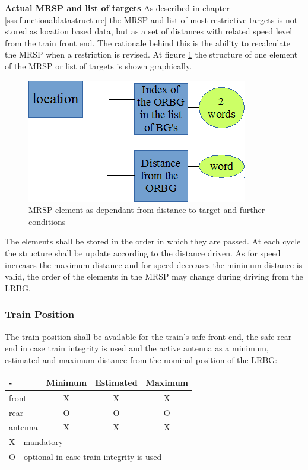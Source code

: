 \textbf{Actual MRSP and list of targets}
As described in chapter \ref{sss:functionaldatastructure} the MRSP and list of most restrictive targets is not stored as location based data, but as a set of distances with related speed level from the train front end. The rationale behind this is the ability to recalculate the MRSP when a restriction is revised.
At figure \ref{fig:SingleElementLocationBasedDataStructure} the structure of one element of the MRSP or list of targets is shown graphically.

\begin{figure}[ht]
\centering
\includegraphics[scale=0.6]{../images/ORBG.png}
\caption{MRSP element as dependant from distance to target and further conditions}\label{fig:SingleElementLocationBasedDataStructure}
\end{figure}

The elements shall be stored in the order in which they are passed. At each cycle the structure shall be update according to the distance driven. As for speed increases the maximum distance and for speed decreases the minimum distance is valid, the order of the elements in the MRSP may change during driving from the LRBG.


\subsubsection{Train Position}
The train position shall be available for the train's safe front end, the safe rear end in case train integrity is used and the active antenna as a minimum, estimated and maximum distance from the nominal position of the LRBG:

\begin{center}
\begin{tabular}{ l || c | c | c }
  -       & Minimum & Estimated & Maximum \\ \hline \hline
  front  & X & X & X \\ \hline
  rear   & O & O & O \\ \hline
  antenna& X & X & X \\ \hline 
\multicolumn{4}{l}{X - mandatory} \\
\multicolumn{4}{l}{O - optional in case train integrity is used} \\
\end{tabular}
\label{tbl:AvailableSafeDistances}
\end{center}


